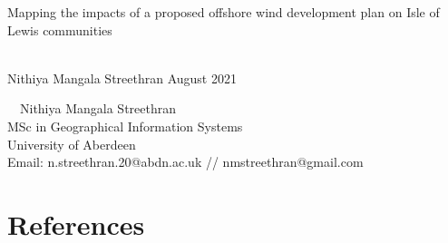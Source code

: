 \documentclass[twoside,12pt,openany]{book}
\def\theauthor{Nithiya Mangala Streethran}
\def\thetitle{%
  Mapping the impacts of a proposed offshore wind development plan on
  Isle of Lewis communities%
}
\begin{document}

\frontmatter

\begin{titlepage}
  \hspace{0pt}\vfill %
  \centering %
  \Large\thetitle
  \\[4cm]
  \large\theauthor
  \vfill
  August 2021
  \vfill\hspace{0pt} %
\end{titlepage}

{\setlength{\parindent}{0pt}
\hspace{0pt}\vfill
\textcopyright~\the\year{}~\theauthor
\\[.5cm]
MSc in Geographical Information Systems
\\[.5cm]
University of Aberdeen
\\[.5cm]
Email: n.streethran.20@abdn.ac.uk // nmstreethran@gmail.com
\vfill\hspace{0pt}
}

\doublespacing



\tableofcontents
\listoffigures
\listoftables
\printglossaries



\themainmatter








{%
  \backmatter%
  \chapter{References}%
  \printbibliography[category=cited,heading=none]%
}

\nocite{*}
\theappendix


\end{document}
